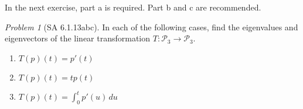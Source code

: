 \documentclass[fleqn,11pt]{paper}
\theoremstyle{remark}
\newtheorem{problem}{Problem}
\newtheorem*{solution}{{\bf Solution}}
\newcommand{\<}{\ensuremath{\langle}}
\renewcommand{\>}{\ensuremath{\rangle}}
\begin{document}
\noindent In the next exercise, part a is required.  Part b and c are recommended.
\begin{problem}[SA 6.1.13abc]
In each of the following cases, find the eigenvalues and eigenvectors of the linear
transformation $T : \mathcal{P}_3 \to \mathcal{P}_3$.
\begin{enumerate}[{\bf a.}]
\item $T(p)(t) = p'(t)$
\item $T(p)(t) = tp(t)$
\item $T(p)(t) = \int_0^t p'(u)\, du$
\end{enumerate}
\end{problem}
\end{document}
